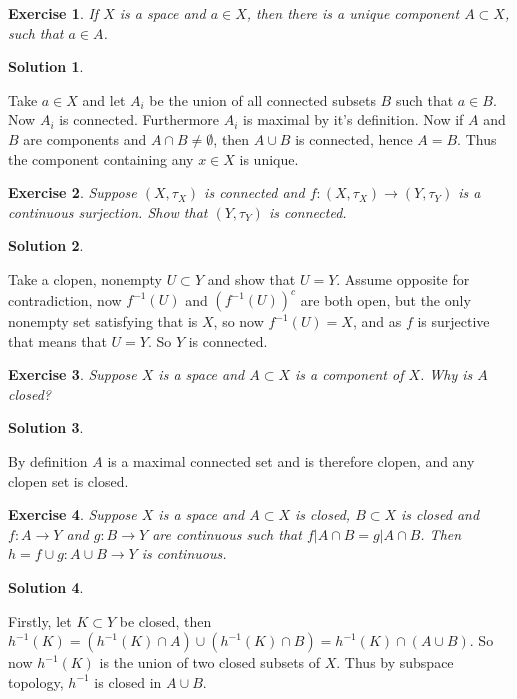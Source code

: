 \documentclass[11pt,a4paper]{article}
\newtheorem{Ex}{Exercise}
\newtheorem{Sol}{Solution}
\begin{document}
\begin{Ex}
	If $X$ is a space and $a \in X$, then there is a unique component $A \subset X$, such that $a \in A$.
\end{Ex}

\begin{Sol} \end{Sol}
\noindent Take $a \in X$ and let $A_i$ be the union of all connected subsets $B$ such that $a \in B$. Now $A_i$ is connected. Furthermore $A_i$ is maximal by it's definition. Now if $A$ and $B$ are components and $A \cap B \neq \emptyset$, then $A \cup B$ is connected, hence $A = B$. Thus the component containing any $x \in X$ is unique.

\begin{Ex}
	Suppose $(X, \tau_X)$ is connected and $f: (X, \tau_X) \rightarrow (Y, \tau_Y)$ is a continuous surjection. Show that $(Y, \tau_Y)$ is connected.
\end{Ex}

\begin{Sol} \end{Sol}
\noindent Take a clopen, nonempty $U \subset Y$ and show that $U = Y$. Assume opposite for contradiction, now $f^{-1}(U)$ and $(f^{-1}(U))^c$ are both open, but the only nonempty set satisfying that is $X$, so now $f^{-1}(U) = X$, and as $f$ is surjective that means that $U = Y$. So $Y$ is connected.

\begin{Ex}
	Suppose $X$ is a space and $A \subset X$ is a component of $X$. Why is $A$ closed?
\end{Ex}

\begin{Sol} \end{Sol}
\noindent By definition $A$ is a maximal connected set and is therefore clopen, and any clopen set is closed.

\begin{Ex}
	Suppose $X$ is a space and $A \subset X$ is closed, $B \subset X$ is closed and $f: A \rightarrow Y$ and $g: B \rightarrow Y$ are continuous such that $f|A \cap B = g|A\cap B$. Then $h = f \cup g: A\cup B \rightarrow Y$ is continuous.
\end{Ex}

\begin{Sol} \end{Sol}
\noindent Firstly, let $K \subset Y$ be closed, then $h^{-1}(K) = (h^{-1}(K) \cap A) \cup (h^{-1}(K) \cap B) = h^{-1}(K) \cap (A \cup B)$. So now $h^{-1}(K)$ is the union of two closed subsets of $X$. Thus by subspace topology, $h^{-1}$ is closed in $A \cup B$.
\end{document}
